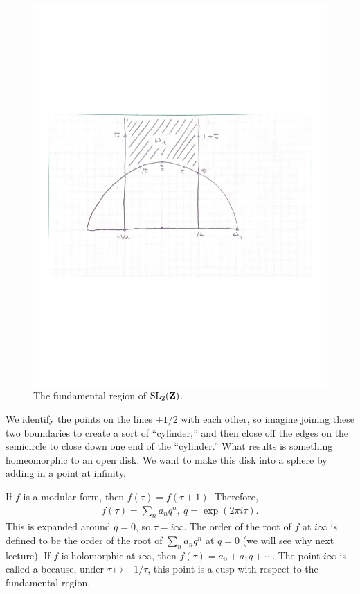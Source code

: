 \documentclass[11pt, oneside,margin=1in]{article}
\begin{document}
\begin{figure}
	\begin{center}
		\includegraphics[scale=0.55]{fundamental_domain}
		\caption{The fundamental region of $\operatorname{SL}_{2}(\mathbf Z)$.}
	\end{center}
\end{figure}

We identify the points on the lines $\pm 1/2$ with each other, so imagine joining these two boundaries to create a sort of ``cylinder,'' and then close off the edges on the semicircle to close down one end of the ``cylinder.'' What results is something homeomorphic to an open disk. We want to make this disk into a sphere by adding in a point at infinity. 

If $f$ is a modular form, then $f(\tau) = f (\tau+1)$. Therefore,
\begin{align*}
	f(\tau) =  \sum_{n}^{}a_nq^n,\ q = \exp(2\pi i \tau). 
\end{align*}
This is expanded around $q=0$, so $\tau = i\infty$. The order of the root of $f$ at $i\infty$ is defined to be the order of the root of $\sum_{n}^{} a_nq^n$ at $q = 0$ (we will see why next lecture). If $f$ is holomorphic at $i\infty$, then $f(\tau) = a_0 + a_1q + \cdots$. The point $i\infty$ is called a  because, under $\tau \longmapsto -1/\tau$, this point is a cusp with respect to the fundamental region.
\end{document}
